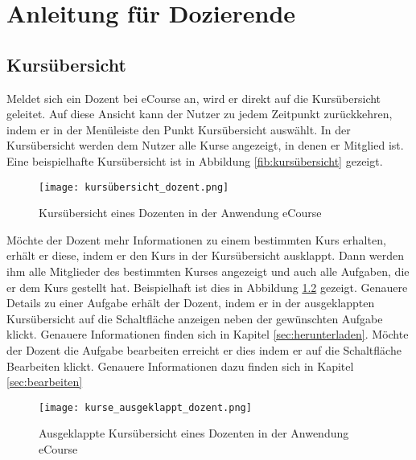 
\chapter{Anleitung für Dozierende}
\label{sec:chap2}

\section{Kursübersicht}
Meldet sich ein Dozent bei eCourse an, wird er direkt auf die Kursübersicht geleitet. Auf diese Ansicht kann der Nutzer zu jedem Zeitpunkt zurückkehren, indem er in der Menüleiste den Punkt \glqq Kursübersicht \grqq auswählt. In der Kursübersicht werden dem Nutzer alle Kurse angezeigt, in denen er Mitglied ist. Eine beispielhafte Kursübersicht ist in Abbildung \ref{fib:kursübersicht} gezeigt.

\begin{figure}[h]
\centering
\texttt{[image: kursübersicht\_dozent.png]}
\caption{Kursübersicht eines Dozenten in der Anwendung eCourse}
\label{fib:kursübersicht_dozent}
\end{figure}

Möchte der Dozent mehr Informationen zu einem bestimmten Kurs erhalten, erhält er diese, indem er den Kurs in der Kursübersicht ausklappt. Dann werden ihm alle Mitglieder des bestimmten Kurses angezeigt und auch alle Aufgaben, die er dem Kurs gestellt hat. Beispielhaft ist dies in Abbildung \ref{fib:kursübersicht_dozent_ausgeklappt} gezeigt. Genauere Details zu einer Aufgabe erhält der Dozent, indem er in der ausgeklappten Kursübersicht auf die Schaltfläche \glqq anzeigen\grqq\; neben der gewünschten Aufgabe klickt. Genauere Informationen finden sich in Kapitel \ref{sec:herunterladen}. Möchte der Dozent die Aufgabe bearbeiten erreicht er dies indem er auf die Schaltfläche \glqq Bearbeiten\grqq\; klickt. Genauere Informationen dazu finden sich in Kapitel \ref{sec:bearbeiten}
 
\begin{figure}[h]
\centering
\texttt{[image: kurse\_ausgeklappt\_dozent.png]}
\caption{Ausgeklappte Kursübersicht eines Dozenten in der Anwendung eCourse}
\label{fib:kursübersicht_dozent_ausgeklappt}
\end{figure}

